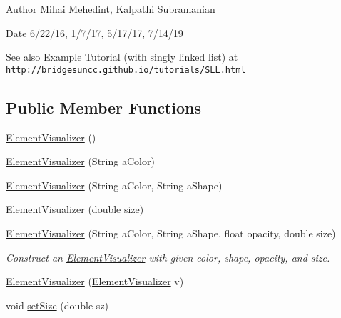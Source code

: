 \begin{DoxyAuthor}{Author}
Mihai Mehedint, Kalpathi Subramanian
\end{DoxyAuthor}
\begin{DoxyDate}{Date}
6/22/16, 1/7/17, 5/17/17, 7/14/19
\end{DoxyDate}
\begin{DoxySeeAlso}{See also}
Example Tutorial (with singly linked list) at ~\newline
 \href{http://bridgesuncc.github.io/tutorials/SLL.html}{\tt http\+://bridgesuncc.\+github.\+io/tutorials/\+S\+L\+L.\+html} 
\end{DoxySeeAlso}
\subsection*{Public Member Functions}
\begin{DoxyCompactItemize}
\item 
\mbox{\hyperlink{classbridges_1_1base_1_1_element_visualizer_acbca874876ec1e8dbbde6484a4fc056e}{Element\+Visualizer}} ()
\item 
\mbox{\hyperlink{classbridges_1_1base_1_1_element_visualizer_a5c0d9fe8051ebc816372b9836689fdfa}{Element\+Visualizer}} (String a\+Color)
\item 
\mbox{\hyperlink{classbridges_1_1base_1_1_element_visualizer_ab62b1b06907fbeddfcee2b4b297e1021}{Element\+Visualizer}} (String a\+Color, String a\+Shape)
\item 
\mbox{\hyperlink{classbridges_1_1base_1_1_element_visualizer_ab32f66b72ccf0a26c03ba44006da9ac6}{Element\+Visualizer}} (double size)
\item 
\mbox{\hyperlink{classbridges_1_1base_1_1_element_visualizer_a9bf06ca1b6c215e079ab33ccd99633e8}{Element\+Visualizer}} (String a\+Color, String a\+Shape, float opacity, double size)
\begin{DoxyCompactList}\small\item\em Construct an \mbox{\hyperlink{classbridges_1_1base_1_1_element_visualizer}{Element\+Visualizer}} with given color, shape, opacity, and size. \end{DoxyCompactList}\item 
\mbox{\hyperlink{classbridges_1_1base_1_1_element_visualizer_a5b48cbda94a4e84e40de41fe156e2497}{Element\+Visualizer}} (\mbox{\hyperlink{classbridges_1_1base_1_1_element_visualizer}{Element\+Visualizer}} v)
\item 
void \mbox{\hyperlink{classbridges_1_1base_1_1_element_visualizer_aba410184f7df495594fc1fa7948335a5}{set\+Size}} (double sz)

\end{DoxyCompactItemize}
